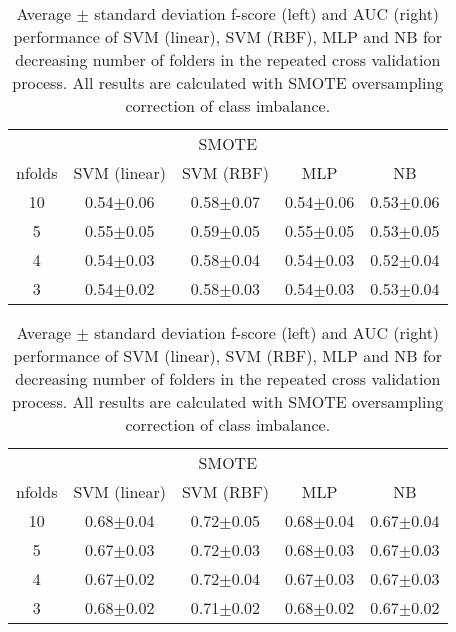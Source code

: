 \documentclass[onesided]{article}\usepackage[]{graphicx}\usepackage[]{color}
\begin{document}
\begin{table}[!htbp]
\centering
\footnotesize
\caption{Average $\pm$ standard deviation f-score (left) and AUC (right) performance of SVM (linear), SVM (RBF), MLP and NB for decreasing number of folders in the repeated cross validation process. All results are calculated with SMOTE oversampling correction of class imbalance.}
\label{tab:f_auc}
\begin{tabular}{*5c}
\toprule
  \multicolumn{5}{c}{SMOTE} \\
nfolds & SVM (linear) & SVM (RBF) & MLP & NB
\\
\midrule
10 & 0.54$\pm$0.06 & 0.58$\pm$0.07 & 0.54$\pm$0.06 & 0.53$\pm$0.06
\\
5 & 0.55$\pm$0.05 & 0.59$\pm$0.05 & 0.55$\pm$0.05 & 0.53$\pm$0.05
\\
4 & 0.54$\pm$0.03 & 0.58$\pm$0.04 & 0.54$\pm$0.03 & 0.52$\pm$0.04
\\
3 & 0.54$\pm$0.02 & 0.58$\pm$0.03 & 0.54$\pm$0.03 & 0.53$\pm$0.04
\\
\bottomrule
\end{tabular}
\quad
\begin{tabular}{*5c}
\toprule
  \multicolumn{5}{c}{SMOTE} \\
nfolds & SVM (linear) & SVM (RBF) & MLP & NB
\\
\midrule
10 & 0.68$\pm$0.04 & 0.72$\pm$0.05 & 0.68$\pm$0.04 & 0.67$\pm$0.04
\\
5 & 0.67$\pm$0.03 & 0.72$\pm$0.03 & 0.68$\pm$0.03 & 0.67$\pm$0.03
\\
4 & 0.67$\pm$0.02 & 0.72$\pm$0.04 & 0.67$\pm$0.03 & 0.67$\pm$0.03
\\
3 & 0.68$\pm$0.02 & 0.71$\pm$0.02 & 0.68$\pm$0.02 & 0.67$\pm$0.02
\\
\bottomrule
\end{tabular}

\end{table}


\newpage
{}
\setcounter{page}{1}
\printbibliography









\clearpage
\end{document}
